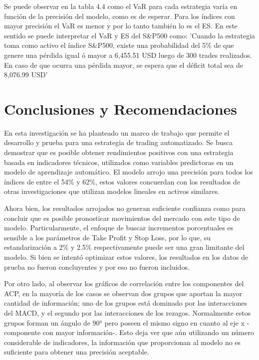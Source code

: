 \documentclass[a4paper,12pt]{Latex/Classes/PhDthesisPSnPDF}
\begin{document}
Se puede observar en la tabla 4.4 como el VaR para cada estrategia varía en función de la precisión del modelo, como es de esperar. Para los índices con mayor precisión el VaR es menor y por lo tanto también lo es el ES. En este sentido se puede interpretar el VaR y ES del S\&P500 como: 'Cuando la estrategia toma como activo el índice S\&P500, existe una probabilidad del 5\% de que genere una pérdida igual ó mayor a 6,455.51 USD luego de 300 trades realizados. En caso de que ocurra una pérdida mayor, se espera que el déficit total sea de 8,076.99 USD'

\chapter*{Conclusiones y Recomendaciones}

En esta investigación se ha planteado un marco de trabajo que permite el desarrollo y prueba para una estrategia de trading automatizado. Se busca demostrar que es posible obtener rendimientos positivos con una estrategia basada en indicadores técnicos, utilizados como variables predictoras en un modelo de aprendizaje automático. El modelo arrojo una precisión para todos los índices de entre el 54\% y 62\%, estos valores concuerdan con los resultados de otras investigaciones que utilizan modelos lineales en activos similares. 

Ahora bien, los resultados arrojados no generan suficiente confianza como para concluir que es posible pronosticar movimientos del mercado con este tipo de modelo. Particularmente, el enfoque de buscar incrementos porcentuales es sensible a los parámetros de Take Profit y Stop Loss, por lo que, su estandarización a 2\% y 2.5\% respectivamente puede ser una gran limitante del modelo. Si bien se intentó optimizar estos valores, los resultados en los datos de prueba no fueron concluyentes y por eso no fueron incluidos.

Por otro lado, al observar los gráficos de correlación entre los componentes del ACP, en la mayoría de los casos se observan dos grupos que aportan la mayor cantidad de información; uno de los grupos está dominado por las interacciones del MACD, y el segundo por las interacciones de los rezagos. Normalmente estos grupos forman un ángulo de 90° pero poseen el mismo signo en cuanto al eje x -componente con mayor información-. Esto deja ver que aún utilizando un número considerable de indicadores, la información que proporcionan al modelo no es suficiente para obtener una precisión aceptable. 
\end{document}
